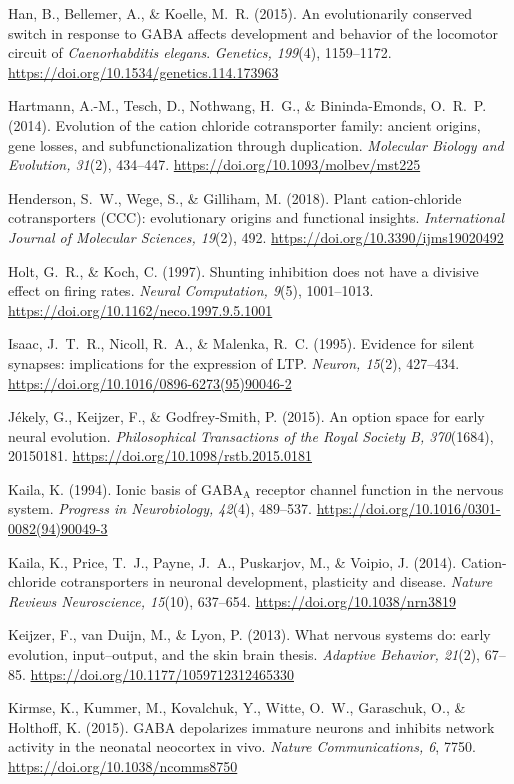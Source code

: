 \documentclass[11pt,a4paper]{article}
\newenvironment{apabib}{\raggedright\begin{list}{}{%
  \setlength{\leftmargin}{1.6em}\setlength{\itemindent}{-1.6em}%
  \setlength{\itemsep}{3pt}\setlength{\parsep}{0pt}\setlength{\topsep}{4pt}}}%
  {\end{list}}
\begin{document}
\begin{apabib}
\item Han, B., Bellemer, A., \& Koelle, M.~R. (2015). An evolutionarily conserved switch in response to GABA affects development and behavior of the locomotor circuit of \emph{Caenorhabditis elegans}. \emph{Genetics, 199}(4), 1159--1172. \url{https://doi.org/10.1534/genetics.114.173963}
\item Hartmann, A.-M., Tesch, D., Nothwang, H.~G., \& Bininda-Emonds, O.~R.~P. (2014). Evolution of the cation chloride cotransporter family: ancient origins, gene losses, and subfunctionalization through duplication. \emph{Molecular Biology and Evolution, 31}(2), 434--447. \url{https://doi.org/10.1093/molbev/mst225}
\item Henderson, S.~W., Wege, S., \& Gilliham, M. (2018). Plant cation-chloride cotransporters (CCC): evolutionary origins and functional insights. \emph{International Journal of Molecular Sciences, 19}(2), 492. \url{https://doi.org/10.3390/ijms19020492}
\item Holt, G.~R., \& Koch, C. (1997). Shunting inhibition does not have a divisive effect on firing rates. \emph{Neural Computation, 9}(5), 1001--1013. \url{https://doi.org/10.1162/neco.1997.9.5.1001}
\item Isaac, J.~T.~R., Nicoll, R.~A., \& Malenka, R.~C. (1995). Evidence for silent synapses: implications for the expression of LTP. \emph{Neuron, 15}(2), 427--434. \url{https://doi.org/10.1016/0896-6273(95)90046-2}
\item J\'ekely, G., Keijzer, F., \& Godfrey-Smith, P. (2015). An option space for early neural evolution. \emph{Philosophical Transactions of the Royal Society B, 370}(1684), 20150181. \url{https://doi.org/10.1098/rstb.2015.0181}
\item Kaila, K. (1994). Ionic basis of GABA$_{\mathrm{A}}$ receptor channel function in the nervous system. \emph{Progress in Neurobiology, 42}(4), 489--537. \url{https://doi.org/10.1016/0301-0082(94)90049-3}
\item Kaila, K., Price, T.~J., Payne, J.~A., Puskarjov, M., \& Voipio, J. (2014). Cation-chloride cotransporters in neuronal development, plasticity and disease. \emph{Nature Reviews Neuroscience, 15}(10), 637--654. \url{https://doi.org/10.1038/nrn3819}
\item Keijzer, F., van Duijn, M., \& Lyon, P. (2013). What nervous systems do: early evolution, input--output, and the skin brain thesis. \emph{Adaptive Behavior, 21}(2), 67--85. \url{https://doi.org/10.1177/1059712312465330}
\item Kirmse, K., Kummer, M., Kovalchuk, Y., Witte, O.~W., Garaschuk, O., \& Holthoff, K. (2015). GABA depolarizes immature neurons and inhibits network activity in the neonatal neocortex in vivo. \emph{Nature Communications, 6}, 7750. \url{https://doi.org/10.1038/ncomms8750}

\end{apabib}
\end{document}
